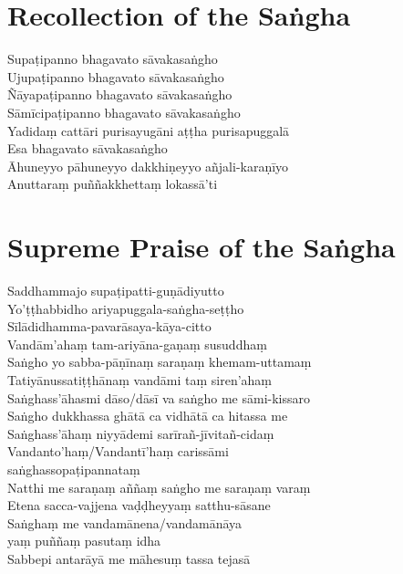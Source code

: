 \section*{Recollection of the Saṅgha}

\begin{leader}
\end{leader}

Supaṭipanno bhagavato sāvakasaṅgho\\
Ujupaṭipanno bhagavato sāvakasaṅgho\\
Ñāyapaṭipanno bhagavato sāvakasaṅgho\\
Sāmīcipaṭipanno bhagavato sāvakasaṅgho\\
Yadidaṃ cattāri purisayugāni aṭṭha purisapuggalā\\
Esa bhagavato sāvakasaṅgho\\
Āhuneyyo pāhuneyyo dakkhiṇeyyo añjali-karaṇīyo\\
Anuttaraṃ puññakkhettaṃ lokassā'ti

\clearpage

\section*{Supreme Praise of the Saṅgha}

\begin{leader}
\end{leader}

Saddhammajo supaṭipatti-guṇādiyutto\\
Yo'ṭṭhabbidho ariyapuggala-saṅgha-seṭṭho\\
Sīlādidhamma-pavarāsaya-kāya-citto\\
Vandām'ahaṃ tam-ariyāna-gaṇaṃ susuddhaṃ\\
Saṅgho yo sabba-pāṇīnaṃ saraṇaṃ khemam-uttamaṃ\\
Tatiyānussatiṭṭhānaṃ vandāmi taṃ siren'ahaṃ\\
Saṅghass'āhasmi dāso/dāsī va saṅgho me sāmi-kissaro\\
Saṅgho dukkhassa ghātā ca vidhātā ca hitassa me\\
Saṅghass'āhaṃ niyyādemi sarīrañ-jīvitañ-cidaṃ\\
Vandanto'haṃ/Vandantī'haṃ carissāmi\\
\vin saṅghassopaṭipannataṃ\\
Natthi me saraṇaṃ aññaṃ saṅgho me saraṇaṃ varaṃ\\
Etena sacca-vajjena vaḍḍheyyaṃ satthu-sāsane\\
Saṅghaṃ me vandamānena/vandamānāya\\
\vin yaṃ puññaṃ pasutaṃ idha\\
Sabbepi antarāyā me māhesuṃ tassa tejasā

